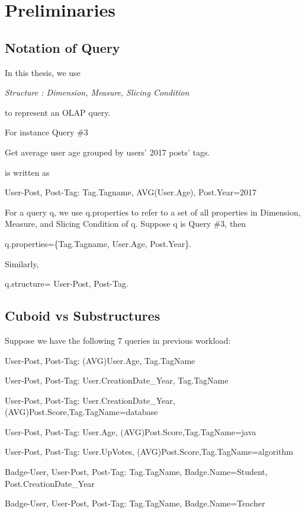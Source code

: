 
\section{Preliminaries}
\subsection{Notation of Query}


In this thesis, we use 

\textit{Structure : Dimension, Measure, Slicing Condition}

to represent an OLAP query. 

For instance Query \#3 

Get average user age grouped by users’ 2017 posts’ tags. 

is written as

User-Post, Post-Tag: Tag.Tagname, AVG(User.Age), Post.Year=2017

For a query q, we use q.properties to refer to a set of all properties in Dimension, Measure, and Slicing Condition of q. Suppose q is Query \#3, then

 q.properties=\{Tag.Tagname, User.Age, Post.Year\}.
 
 Similarly,
 
 q.structure= User-Post, Post-Tag.


\subsection{Cuboid vs Substructures}
Suppose we have the following 7 queries in previous workload:

User-Post, Post-Tag: (AVG)User.Age, Tag.TagName

User-Post, Post-Tag: User.CreationDate\_Year, Tag.TagName

User-Post, Post-Tag: User.CreationDate\_Year, (AVG)Post.Score,Tag.TagName=database

User-Post, Post-Tag: User.Age, (AVG)Post.Score,Tag.TagName=java

User-Post, Post-Tag: User.UpVotes, (AVG)Post.Score,Tag.TagName=algorithm

Badge-User, User-Post, Post-Tag: Tag.TagName, Badge.Name=Student, Post.CreationDate\_Year

Badge-User, User-Post, Post-Tag: Tag.TagName, Badge.Name=Teacher

